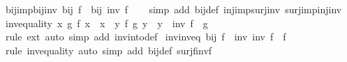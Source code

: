 \begin{isabellebody}
\isamarkupfalse%
%
\endisatagproof
{\isafoldproof}%
%
\isadelimproof
\isanewline
%
\endisadelimproof
\isanewline
{}\isamarkupfalse%
\ bij{\isacharunderscore}{\kern0pt}imp{\isacharunderscore}{\kern0pt}bij{\isacharunderscore}{\kern0pt}inv{\isacharcolon}{\kern0pt}\ {\isachardoublequoteopen}bij\ f\ {\isasymLongrightarrow}\ bij\ {\isacharparenleft}{\kern0pt}inv\ f{\isacharparenright}{\kern0pt}{\isachardoublequoteclose}\isanewline
%
\isadelimproof
\ \ %
\endisadelimproof
%
\isatagproof
{}\isamarkupfalse%
\ {\isacharparenleft}{\kern0pt}simp\ add{\isacharcolon}{\kern0pt}\ bij{\isacharunderscore}{\kern0pt}def\ inj{\isacharunderscore}{\kern0pt}imp{\isacharunderscore}{\kern0pt}surj{\isacharunderscore}{\kern0pt}inv\ surj{\isacharunderscore}{\kern0pt}imp{\isacharunderscore}{\kern0pt}inj{\isacharunderscore}{\kern0pt}inv{\isacharparenright}{\kern0pt}%
\endisatagproof
{\isafoldproof}%
%
\isadelimproof
\isanewline
%
\endisadelimproof
\isanewline
{}\isamarkupfalse%
\ inv{\isacharunderscore}{\kern0pt}equality{\isacharcolon}{\kern0pt}\ {\isachardoublequoteopen}{\isacharparenleft}{\kern0pt}{\isasymAnd}x{\isachardot}{\kern0pt}\ g\ {\isacharparenleft}{\kern0pt}f\ x{\isacharparenright}{\kern0pt}\ {\isacharequal}{\kern0pt}\ x{\isacharparenright}{\kern0pt}\ {\isasymLongrightarrow}\ {\isacharparenleft}{\kern0pt}{\isasymAnd}y{\isachardot}{\kern0pt}\ f\ {\isacharparenleft}{\kern0pt}g\ y{\isacharparenright}{\kern0pt}\ {\isacharequal}{\kern0pt}\ y{\isacharparenright}{\kern0pt}\ {\isasymLongrightarrow}\ inv\ f\ {\isacharequal}{\kern0pt}\ g{\isachardoublequoteclose}\isanewline
%
\isadelimproof
\ \ %
\endisadelimproof
%
\isatagproof
{}\isamarkupfalse%
\ {\isacharparenleft}{\kern0pt}rule\ ext{\isacharparenright}{\kern0pt}\ {\isacharparenleft}{\kern0pt}auto\ simp\ add{\isacharcolon}{\kern0pt}\ inv{\isacharunderscore}{\kern0pt}into{\isacharunderscore}{\kern0pt}def{\isacharparenright}{\kern0pt}%
\endisatagproof
{\isafoldproof}%
%
\isadelimproof
\isanewline
%
\endisadelimproof
\isanewline
{}\isamarkupfalse%
\ inv{\isacharunderscore}{\kern0pt}inv{\isacharunderscore}{\kern0pt}eq{\isacharcolon}{\kern0pt}\ {\isachardoublequoteopen}bij\ f\ {\isasymLongrightarrow}\ inv\ {\isacharparenleft}{\kern0pt}inv\ f{\isacharparenright}{\kern0pt}\ {\isacharequal}{\kern0pt}\ f{\isachardoublequoteclose}\isanewline
%
\isadelimproof
\ \ %
\endisadelimproof
%
\isatagproof
{}\isamarkupfalse%
\ {\isacharparenleft}{\kern0pt}rule\ inv{\isacharunderscore}{\kern0pt}equality{\isacharparenright}{\kern0pt}\ {\isacharparenleft}{\kern0pt}auto\ simp\ add{\isacharcolon}{\kern0pt}\ bij{\isacharunderscore}{\kern0pt}def\ surj{\isacharunderscore}{\kern0pt}f{\isacharunderscore}{\kern0pt}inv{\isacharunderscore}{\kern0pt}f{\isacharparenright}{\kern0pt}%

\end{isabellebody}
